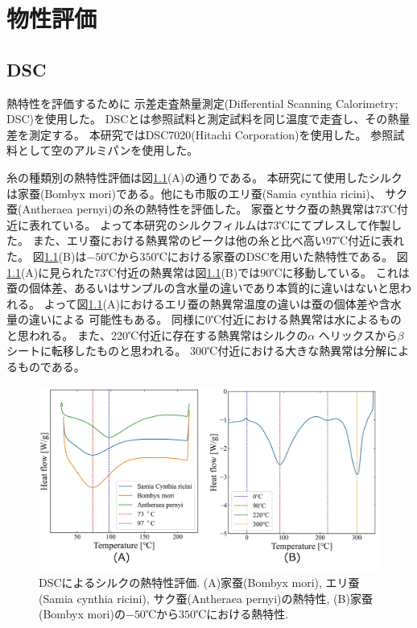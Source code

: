 \documentclass[dvipdfmx,12pt,a4paper]{jreport}
\begin{document}
		\chapter{物性評価}
		\section{DSC}
		\label{DSC}
		熱特性を評価するために
		示差走査熱量測定(Differential Scanning Calorimetry; DSC)を使用した。
		DSCとは参照試料と測定試料を同じ温度で走査し、その熱量差を測定する。
		本研究ではDSC7020(Hitachi Corporation)を使用した。
		参照試料として空のアルミパンを使用した。
	
		糸の種類別の熱特性評価は図\ref{DSC熱特性評価}(A)の通りである。
		本研究にて使用したシルクは家蚕(Bombyx mori)である。他にも市販のエリ蚕(Samia cynthia ricini)、
		サク蚕(Antheraea pernyi)の糸の熱特性を評価した。
		家蚕とサク蚕の熱異常は73℃付近に表れている。
		よって本研究のシルクフィルムは73℃にてプレスして作製した。
		また、エリ蚕における熱異常のピークは他の糸と比べ高い97℃付近に表れた。
		図\ref{DSC熱特性評価}(B)は$-50$℃から$350$℃における家蚕のDSCを用いた熱特性である。
		図\ref{DSC熱特性評価}(A)に見られた73℃付近の熱異常は図\ref{DSC熱特性評価}(B)では90℃に移動している。
		これは蚕の個体差、あるいはサンプルの含水量の違いであり本質的に違いはないと思われる。
		よって図\ref{DSC熱特性評価}(A)におけるエリ蚕の熱異常温度の違いは蚕の個体差や含水量の違いによる
		可能性もある。
		同様に0℃付近における熱異常は水によるものと思われる。
		また、220℃付近に存在する熱異常はシルクの$\alpha$ ヘリックスから$\beta$シートに転移したものと思われる。
		300℃付近における大きな熱異常は分解によるものである。
		\begin{figure}[H]
			\centering
			\includegraphics[scale=0.75]{DSC_silk_0112_2.jpg}
			\caption{DSCによるシルクの熱特性評価. (A)家蚕(Bombyx mori), エリ蚕(Samia cynthia ricini), 
			サク蚕(Antheraea pernyi)の熱特性, (B)家蚕(Bombyx mori)の$-50$℃から$350$℃における熱特性.}
			\label{DSC熱特性評価}
		\end{figure}
\end{document}
